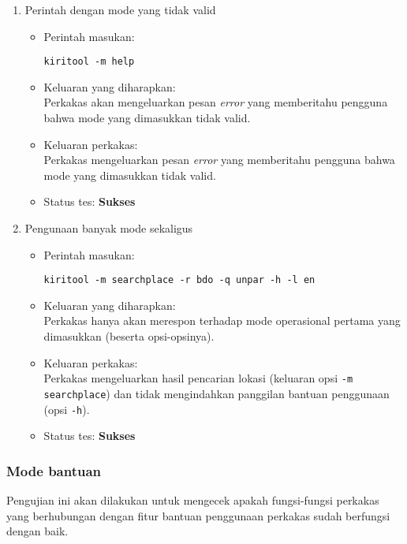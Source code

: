 \begin{enumerate}
	\item Perintah dengan mode yang tidak valid
	\begin{itemize}
		\item Perintah masukan:
		\begin{verbatim}
kiritool -m help
		\end{verbatim}
		\item Keluaran yang diharapkan: \\
		Perkakas akan mengeluarkan pesan \textit{error} yang memberitahu pengguna bahwa mode yang dimasukkan tidak valid.
		\item Keluaran perkakas: \\
		Perkakas mengeluarkan pesan \textit{error} yang memberitahu pengguna bahwa mode yang dimasukkan tidak valid.
		\item Status tes: \textbf{Sukses}
	\end{itemize}
	
	\item Pengunaan banyak mode sekaligus
	\begin{itemize}
		\item Perintah masukan:
		\begin{verbatim}
kiritool -m searchplace -r bdo -q unpar -h -l en
		\end{verbatim}
		\item Keluaran yang diharapkan: \\
		Perkakas hanya akan merespon terhadap mode operasional pertama yang dimasukkan (beserta opsi-opsinya).
		\item Keluaran perkakas: \\
		Perkakas mengeluarkan hasil pencarian lokasi (keluaran opsi \verb|-m searchplace|) dan tidak mengindahkan panggilan bantuan penggunaan (opsi \verb|-h|).
		\item Status tes: \textbf{Sukses}
	\end{itemize}

\end{enumerate}

\subsubsection{Mode bantuan}
\label{sec:testing-experiments-help}

Pengujian ini akan dilakukan untuk mengecek apakah fungsi-fungsi perkakas yang berhubungan dengan fitur bantuan penggunaan perkakas sudah berfungsi dengan baik.

